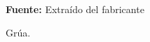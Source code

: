 
\begin{figure}[H]
\centering
{}
\caption{Gr\'ua. }{\textbf{Fuente:} Extra\'ido del fabricante \cite{westmarine_trac_nodate}}
\label{fig:cormoranMotor}
\end{figure}

